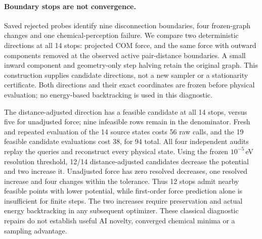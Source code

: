 \paragraph{Boundary stops are not convergence.}
Saved rejected probes identify nine disconnection boundaries, four frozen-graph
changes and one chemical-perception failure. We compare two deterministic
directions at all 14 stops: projected COM force, and the same force with outward
components removed at the observed active pair-distance boundaries. A small
inward component and geometry-only step halving retain the original graph. This
construction supplies candidate directions, not a new sampler or a stationarity
certificate. Both directions and their exact coordinates are frozen before
physical evaluation; no energy-based backtracking is used in this diagnostic.

The distance-adjusted direction has a feasible candidate at all 14 stops, versus
five for unadjusted force; nine infeasible rows remain in the denominator.
Fresh and repeated evaluation of the 14 source states costs 56 raw calls, and
the 19 feasible candidate evaluations cost 38, for 94 total. All four independent
audits replay the queries and reconstruct every physical state. Using the frozen
$10^{-5}$\,eV resolution threshold, 12/14 distance-adjusted candidates decrease
the potential and two increase it. Unadjusted force has zero resolved decreases,
one resolved increase and four changes within the tolerance. Thus 12 stops admit
nearby feasible points with lower potential, while first-order force prediction alone is
insufficient for finite steps. The two increases require preservation and actual
energy backtracking in any subsequent optimizer. These classical diagnostic
repairs do not establish useful AI novelty, converged chemical minima or a
sampling advantage.
